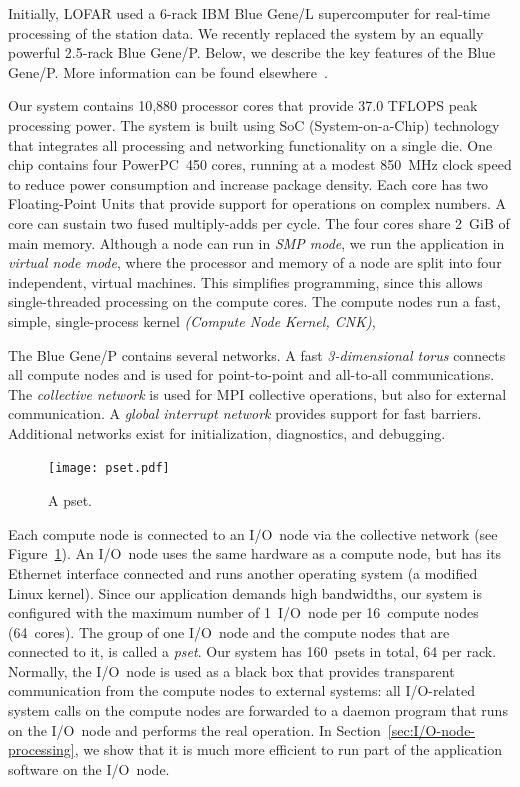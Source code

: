 \documentclass{sig-alternate}
\begin{document}
Initially, LOFAR used a 6-rack IBM Blue Gene/L supercomputer for real-time
processing of the station data.
We recently replaced the system by an equally powerful 2.5-rack Blue Gene/P.
Below, we describe the key features of the Blue Gene/P.
More information can be found elsewhere~\cite{IBM:08}.

Our system contains 10,880 processor cores that provide 37.0 TFLOPS peak
processing power.
The system is built using SoC (System-on-a-Chip) technology that integrates
all processing and networking functionality on a single die.
One chip contains four PowerPC~450 cores, running at a modest 850~MHz clock
speed to reduce power consumption and increase package density.
Each core has two Floating-Point Units that provide support for
operations on complex numbers.
A core can sustain two fused multiply-adds per cycle.
The four cores share 2~GiB of main memory.
Although a node can run in \emph{SMP mode}, we run the application in
\emph{virtual node mode}, where the processor and memory of a node are split
into four independent, virtual machines.
This simplifies programming, since this allows single-threaded processing
on the compute cores.  %
The compute nodes run a fast, simple, single-process kernel
\emph{(Compute Node Kernel, CNK)},

The Blue Gene/P contains several networks.
A fast \emph{3-dimensional torus\/} connects all compute nodes and is used
for point-to-point and all-to-all communications.
The \emph{collective network\/} is used for MPI collective operations,
but also for external communication.
A \emph{global interrupt network\/} provides support for fast barriers.
Additional networks exist for initialization, diagnostics, and debugging.

\begin{figure}[ht]
\texttt{[image: pset.pdf]}
\caption{A pset.}
\label{fig:pset}
\end{figure}

Each compute node is connected to an I/O~node via the collective network
(see Figure~\ref{fig:pset}).
An I/O~node uses the same hardware as a compute node, but has its Ethernet
interface connected and runs another operating system (a modified Linux kernel).
Since our application demands high bandwidths, our system is configured with
the maximum number of 1~I/O~node per 16~compute nodes (64~cores).
The group of one I/O~node and the compute nodes that are connected to it,
is called a \emph{pset}.
Our system has 160~psets in total, 64 per rack.
Normally, the I/O~node is used as a black box that provides transparent
communication from the compute nodes to external systems: all I/O-related
system calls on the compute nodes are forwarded to a daemon program that runs
on the I/O~node and performs the real operation.
In Section~\ref{sec:I/O-node-processing}, we show that it is much more
efficient to run part of the application software on the I/O~node.
\end{document}
